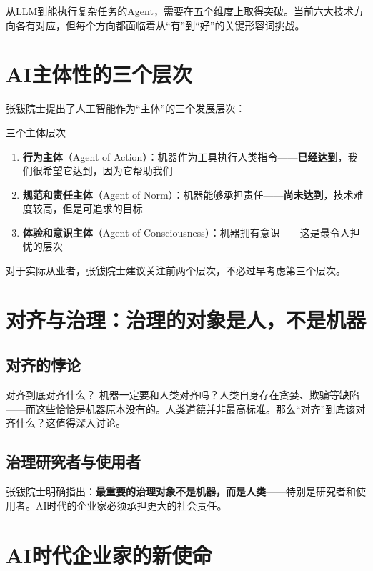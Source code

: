 \documentclass[a4paper]{article}
\begin{document}
从LLM到能执行复杂任务的Agent，需要在五个维度上取得突破。当前六大技术方向各有对应，但每个方向都面临着从``有''到``好''的关键形容词挑战。


\section{AI主体性的三个层次}

张钹院士提出了人工智能作为``主体''的三个发展层次：

\begin{importantbox}{三个主体层次}
\begin{enumerate}
\item \textbf{行为主体}（Agent of Action）：机器作为工具执行人类指令——\textbf{已经达到}，我们很希望它达到，因为它帮助我们
\item \textbf{规范和责任主体}（Agent of Norm）：机器能够承担责任——\textbf{尚未达到}，技术难度较高，但是可追求的目标
\item \textbf{体验和意识主体}（Agent of Consciousness）：机器拥有意识——这是最令人担忧的层次
\end{enumerate}
\end{importantbox}

对于实际从业者，张钹院士建议关注前两个层次，不必过早考虑第三个层次。


\section{对齐与治理：治理的对象是人，不是机器}

\subsection{对齐的悖论}

\begin{warningbox}{对齐到底对齐什么？}
机器一定要和人类对齐吗？人类自身存在贪婪、欺骗等缺陷——而这些恰恰是机器原本没有的。人类道德并非最高标准。那么``对齐''到底该对齐什么？这值得深入讨论。
\end{warningbox}

\subsection{治理研究者与使用者}

张钹院士明确指出：\textbf{最重要的治理对象不是机器，而是人类}——特别是研究者和使用者。AI时代的企业家必须承担更大的社会责任。


\section{AI时代企业家的新使命}
\end{document}
